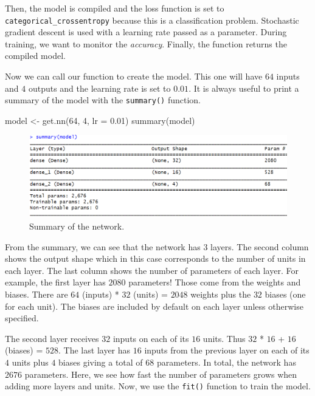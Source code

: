 \documentclass[
  11pt,
]{krantz}
\newenvironment{Shaded}{\begin{snugshade}}{\end{snugshade}}
\newcommand{\AttributeTok}[1]{\textcolor[rgb]{0.61,0.61,0.61}{#1}}
\newcommand{\DecValTok}[1]{\textcolor[rgb]{0.06,0.06,0.06}{#1}}
\newcommand{\FloatTok}[1]{\textcolor[rgb]{0.06,0.06,0.06}{#1}}
\newcommand{\FunctionTok}[1]{\textcolor[rgb]{0,0,0}{#1}}
\newcommand{\NormalTok}[1]{#1}
\newcommand{\OtherTok}[1]{\textcolor[rgb]{0.37,0.37,0.37}{#1}}
\begin{document}
Then, the model is compiled and the loss function is set to \texttt{categorical\_crossentropy} because this is a classification problem. Stochastic gradient descent is used with a learning rate passed as a parameter. During training, we want to monitor the \emph{accuracy}. Finally, the function returns the compiled model.

Now we can call our function to create the model. This one will have \(64\) inputs and \(4\) outputs and the learning rate is set to \(0.01\). It is always useful to print a summary of the model with the \texttt{summary()} function.

\begin{Shaded}
\begin{Highlighting}[]
\NormalTok{model }\OtherTok{\textless{}{-}} \FunctionTok{get.nn}\NormalTok{(}\DecValTok{64}\NormalTok{, }\DecValTok{4}\NormalTok{, }\AttributeTok{lr =} \FloatTok{0.01}\NormalTok{)}
\FunctionTok{summary}\NormalTok{(model)}
\end{Highlighting}
\end{Shaded}

\begin{figure}

{\centering \includegraphics[width=0.9\linewidth]{images/nn_emg_summary} 

}

\caption{Summary of the network.}\label{fig:nnEMGSummary}
\end{figure}

From the summary, we can see that the network has \(3\) layers. The second column shows the output shape which in this case corresponds to the number of units in each layer. The last column shows the number of parameters of each layer. For example, the first layer has \(2080\) parameters! Those come from the weights and biases. There are \(64\) (inputs) * \(32\) (units) = \(2048\) weights plus the \(32\) biases (one for each unit). The biases are included by default on each layer unless otherwise specified.

The second layer receives \(32\) inputs on each of its \(16\) units. Thus \(32\) * \(16\) + \(16\) (biases) = \(528\). The last layer has \(16\) inputs from the previous layer on each of its \(4\) units plus \(4\) biases giving a total of \(68\) parameters. In total, the network has \(2676\) parameters. Here, we see how fast the number of parameters grows when adding more layers and units. Now, we use the \texttt{fit()} function to train the model.
\end{document}
